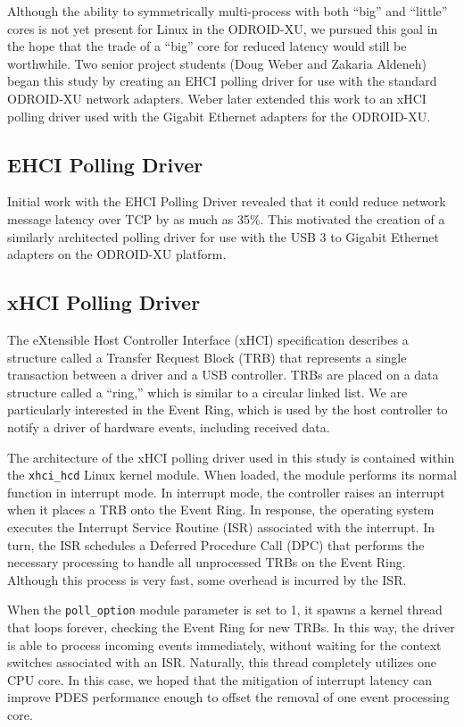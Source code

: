 \documentclass[11pt]{book}
\begin{document}
Although the ability to symmetrically multi-process with both ``big'' and ``little'' cores
is not yet present for Linux in the ODROID-XU, we pursued this goal in the hope that the
trade of a ``big'' core for reduced latency would still be worthwhile.  Two senior project
students (Doug Weber and Zakaria Aldeneh) began this study by creating an EHCI polling
driver for use with the standard ODROID-XU network adapters.  Weber later extended this
work to an xHCI polling driver used with the Gigabit Ethernet adapters for the ODROID-XU.

\subsection{EHCI Polling Driver}

Initial work with the EHCI Polling Driver revealed that it could reduce network message
latency over TCP by as much as 35\%.  This motivated the creation of a similarly
architected polling driver for use with the USB 3 to Gigabit Ethernet adapters on the
ODROID-XU platform.

\subsection{xHCI Polling Driver}

The eXtensible Host Controller Interface (xHCI) specification \cite{xhci} describes a
structure called a Transfer Request Block (TRB) that represents a single transaction
between a driver and a USB controller.  TRBs are placed on a data structure called a
``ring,'' which is similar to a circular linked list.  We are particularly interested in
the Event Ring, which is used by the host controller to notify a driver of hardware
events, including received data.

The architecture of the xHCI polling driver used in this study is contained within the
\verb;xhci_hcd; Linux kernel module.  When loaded, the module performs its normal function
in interrupt mode.  In interrupt mode, the controller raises an interrupt when it places a
TRB onto the Event Ring.  In response, the operating system executes the Interrupt Service
Routine (ISR) associated with the interrupt.  In turn, the ISR schedules a Deferred
Procedure Call (DPC) that performs the necessary processing to handle all unprocessed TRBs
on the Event Ring.  Although this process is very fast, some overhead is incurred by the
ISR.

When the \verb;poll_option; module parameter is set to 1, it spawns a kernel thread that
loops forever, checking the Event Ring for new TRBs.  In this way, the driver is able to
process incoming events immediately, without waiting for the context switches associated
with an ISR.  Naturally, this thread completely utilizes one CPU core.  In this case, we
hoped that the mitigation of interrupt latency can improve PDES performance enough to
offset the removal of one event processing core.
\end{document}
